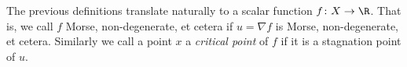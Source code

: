 The previous definitions translate naturally to a scalar function $f\colon X\to\R$.
That is, we call $f$ Morse, non-degenerate, et cetera if $u=\nabla f$ is Morse, non-degenerate, et cetera.
Similarly we call a point $x$ a \emph{critical point} of $f$ if it is a
stagnation point of $u$.


